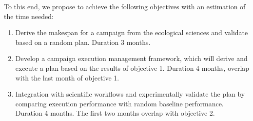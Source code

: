 To this end, we propose to achieve the following objectives with an estimation 
of the time needed:
\begin{enumerate}
    \item Derive the makespan for a campaign from the ecological sciences and validate based on a random plan. Duration 3 months.
    \item Develop a campaign execution management framework, which will derive and execute a plan based on the results of objective 1. Duration 4 months, overlap with the last month of objective 1.
    \item Integration with scientific workflows and experimentally validate the 
    plan by comparing execution performance with random baseline performance.
    Duration 4 months. The first two months overlap with objective 2.
\end{enumerate}


